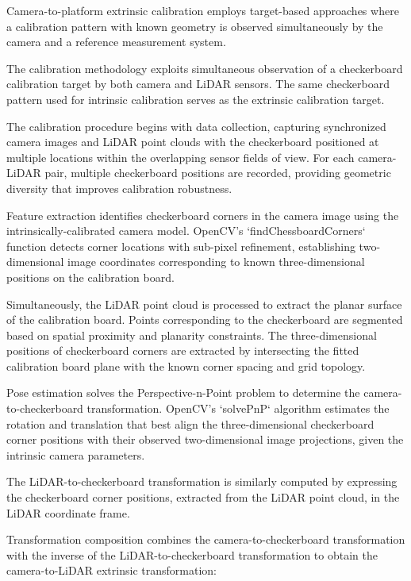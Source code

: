 
Camera-to-platform extrinsic calibration employs target-based approaches where a calibration pattern with known geometry is observed simultaneously by the camera and a reference measurement system.


The calibration methodology exploits simultaneous observation of a checkerboard calibration target by both camera and LiDAR sensors.
The same checkerboard pattern used for intrinsic calibration serves as the extrinsic calibration target.

The calibration procedure begins with data collection, capturing synchronized camera images and LiDAR point clouds with the checkerboard positioned at multiple locations within the overlapping sensor fields of view.
For each camera-LiDAR pair, multiple checkerboard positions are recorded, providing geometric diversity that improves calibration robustness.

Feature extraction identifies checkerboard corners in the camera image using the intrinsically-calibrated camera model.
OpenCV's `findChessboardCorners` function detects corner locations with sub-pixel refinement, establishing two-dimensional image coordinates corresponding to known three-dimensional positions on the calibration board.

Simultaneously, the LiDAR point cloud is processed to extract the planar surface of the calibration board.
Points corresponding to the checkerboard are segmented based on spatial proximity and planarity constraints.
The three-dimensional positions of checkerboard corners are extracted by intersecting the fitted calibration board plane with the known corner spacing and grid topology.

Pose estimation solves the Perspective-n-Point problem to determine the camera-to-checkerboard transformation.
OpenCV's `solvePnP` algorithm estimates the rotation and translation that best align the three-dimensional checkerboard corner positions with their observed two-dimensional image projections, given the intrinsic camera parameters.

The LiDAR-to-checkerboard transformation is similarly computed by expressing the checkerboard corner positions, extracted from the LiDAR point cloud, in the LiDAR coordinate frame.

Transformation composition combines the camera-to-checkerboard transformation with the inverse of the LiDAR-to-checkerboard transformation to obtain the camera-to-LiDAR extrinsic transformation:


